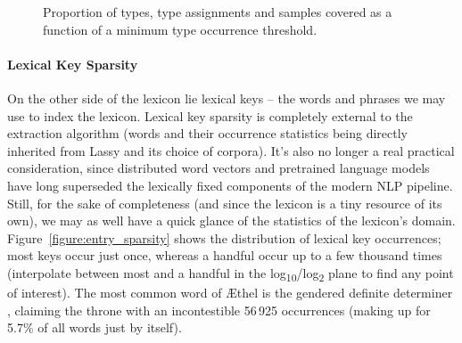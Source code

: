\begin{figure}
	\centering
	\caption{Proportion of types, type assignments and samples covered as a function of a minimum type occurrence threshold.}
	\label{figure:ecdfs}
\end{figure}


\paragraph{Lexical Key Sparsity}
On the other side of the lexicon lie lexical keys -- the words and phrases we may use to index the lexicon.
Lexical key sparsity is completely external to the extraction algorithm (words and their occurrence statistics being directly inherited from Lassy and its choice of corpora).
It's also no longer a real practical consideration, since distributed word vectors and pretrained language models have long superseded the lexically fixed components of the modern NLP pipeline.
Still, for the sake of completeness (and since the lexicon is a tiny resource of its own), we may as well have a quick glance of the statistics of the lexicon's domain.
Figure~\ref{figure:entry_sparsity} shows the distribution of lexical key occurrences; most keys occur just once, whereas a handful occur up to a few thousand times (interpolate between most and a handful in the log\textsubscript{10}/log\textsubscript{2} plane to find any point of interest).
The most common word of \AE thel is the gendered definite determiner , claiming the throne with an incontestible 56\,925 occurrences (making up for 5.7\% of all words just by itself).

